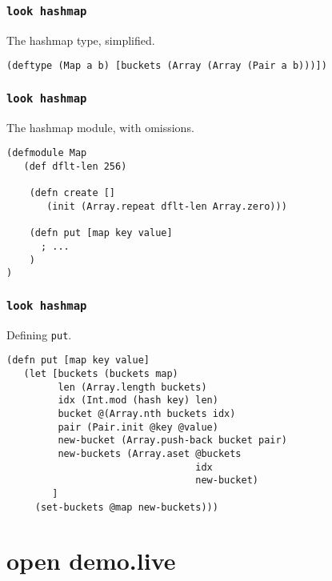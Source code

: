 \documentclass{beamer}
\begin{document}
  \begin{frame}[fragile]
    \frametitle{\texttt{look hashmap}}
    \begin{listing}[H]
      \caption{The hashmap type, simplified.}
      \begin{verbatim}
(deftype (Map a b) [buckets (Array (Array (Pair a b)))])
      \end{verbatim}
    \end{listing}
  \end{frame}
  \begin{frame}[fragile]
    \frametitle{\texttt{look hashmap}}
    \begin{listing}[H]
      \caption{The hashmap module, with omissions.}
      \begin{verbatim}
(defmodule Map
   (def dflt-len 256)

    (defn create []
       (init (Array.repeat dflt-len Array.zero)))

    (defn put [map key value]
      ; ...
    )
)
      \end{verbatim}
    \end{listing}
  \end{frame}
  \begin{frame}[fragile]
    \frametitle{\texttt{look hashmap}}
    \begin{listing}[H]
      \caption{Defining \texttt{put}.}
      \begin{verbatim}
(defn put [map key value]
   (let [buckets (buckets map)
         len (Array.length buckets)
         idx (Int.mod (hash key) len)
         bucket @(Array.nth buckets idx)
         pair (Pair.init @key @value)
         new-bucket (Array.push-back bucket pair)
         new-buckets (Array.aset @buckets
                                 idx
                                 new-bucket)
        ]
     (set-buckets @map new-buckets)))
      \end{verbatim}
    \end{listing}
  \end{frame}
  \section{open demo.live}
\end{document}

